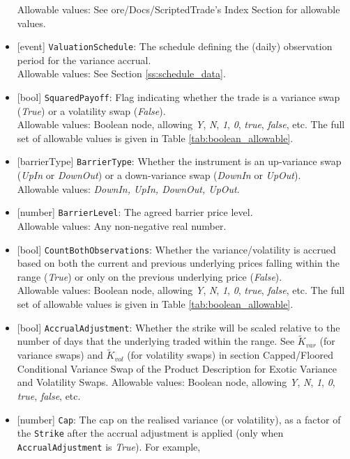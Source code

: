 \begin{itemize}
  Allowable values: See ore/Docs/ScriptedTrade's Index Section for allowable values.
  \item{}[event] \lstinline!ValuationSchedule!: The schedule defining the (daily) observation period for the variance accrual. \\
  Allowable values: See Section \ref{ss:schedule_data}.
  \item{}[bool] \lstinline!SquaredPayoff!: Flag indicating whether the trade is a variance swap (\emph{True}) or a volatility
  swap (\emph{False}). \\
  Allowable values: Boolean node, allowing \emph{Y}, \emph{N}, \emph{1}, \emph{0}, \emph{true}, \emph{false}, etc.
  The full set of allowable values is given in Table \ref{tab:boolean_allowable}.
  \item{}[barrierType] \lstinline!BarrierType!: Whether the instrument is an up-variance swap (\emph{UpIn} or \emph{DownOut}) or 
  a down-variance swap (\emph{DownIn} or \emph{UpOut}). \\
  Allowable values: \emph{DownIn, UpIn, DownOut, UpOut}.
  \item{}[number] \lstinline!BarrierLevel!: The agreed barrier price level. \\
  Allowable values: Any non-negative real number.
  \item{}[bool] \lstinline!CountBothObservations!: Whether the variance/volatility is accrued based on both the current and
  previous underlying prices falling within the range (\emph{True}) or only on the previous underlying price
  (\emph{False}). \\
  Allowable values: Boolean node, allowing \emph{Y}, \emph{N}, \emph{1}, \emph{0}, \emph{true}, \emph{false}, etc.
  The full set of allowable values is given in Table \ref{tab:boolean_allowable}.
  \item{}[bool] \lstinline!AccrualAdjustment!: Whether the strike will be scaled relative to the number of days that the
  underlying traded within the range. See $\widetilde{K}_{var}$ (for variance swaps) and $\widetilde{K}_{vol}$
  (for volatility swaps) in section Capped/Floored Conditional Variance Swap of the Product Description for
  Exotic Variance and Volatility Swaps.
  Allowable values: Boolean node, allowing \emph{Y}, \emph{N}, \emph{1}, \emph{0}, \emph{true}, \emph{false}, etc.
  \item{}[number] \lstinline!Cap!: The cap on the realised variance (or volatility), as a factor of the \lstinline!Strike! after
  the accrual adjustment is applied (only when \lstinline!AccrualAdjustment! is \emph{True}). For example,

\end{itemize}

